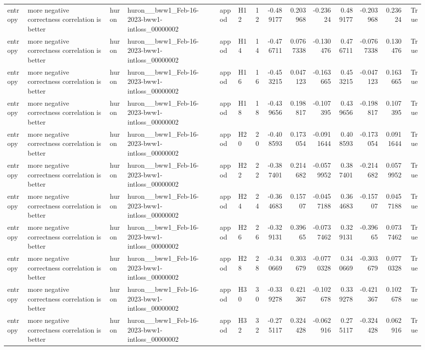 \begin{longtable}{llllllrrrrrrrr}
entropy & more negative correctness correlation is better & huron & huron\_\_bww1\_Feb-16-2023-bww1-intloss\_00000002 & appod & H12 & 12 & -0.489177 & 0.203968 & -0.23624 & 0.489177 & -0.203968 & 0.23624 & True \\
entropy & more negative correctness correlation is better & huron & huron\_\_bww1\_Feb-16-2023-bww1-intloss\_00000002 & appod & H14 & 14 & -0.476711 & 0.0767338 & -0.130476 & 0.476711 & -0.0767338 & 0.130476 & True \\
entropy & more negative correctness correlation is better & huron & huron\_\_bww1\_Feb-16-2023-bww1-intloss\_00000002 & appod & H16 & 16 & -0.453215 & 0.047123 & -0.163665 & 0.453215 & -0.047123 & 0.163665 & True \\
entropy & more negative correctness correlation is better & huron & huron\_\_bww1\_Feb-16-2023-bww1-intloss\_00000002 & appod & H18 & 18 & -0.439656 & 0.198817 & -0.107395 & 0.439656 & -0.198817 & 0.107395 & True \\
entropy & more negative correctness correlation is better & huron & huron\_\_bww1\_Feb-16-2023-bww1-intloss\_00000002 & appod & H20 & 20 & -0.408593 & 0.173054 & -0.0911644 & 0.408593 & -0.173054 & 0.0911644 & True \\
entropy & more negative correctness correlation is better & huron & huron\_\_bww1\_Feb-16-2023-bww1-intloss\_00000002 & appod & H22 & 22 & -0.387401 & 0.214682 & -0.0579952 & 0.387401 & -0.214682 & 0.0579952 & True \\
entropy & more negative correctness correlation is better & huron & huron\_\_bww1\_Feb-16-2023-bww1-intloss\_00000002 & appod & H24 & 24 & -0.364683 & 0.15707 & -0.0457188 & 0.364683 & -0.15707 & 0.0457188 & True \\
entropy & more negative correctness correlation is better & huron & huron\_\_bww1\_Feb-16-2023-bww1-intloss\_00000002 & appod & H26 & 26 & -0.329131 & 0.39665 & -0.0737462 & 0.329131 & -0.39665 & 0.0737462 & True \\
entropy & more negative correctness correlation is better & huron & huron\_\_bww1\_Feb-16-2023-bww1-intloss\_00000002 & appod & H28 & 28 & -0.340669 & 0.303679 & -0.0770328 & 0.340669 & -0.303679 & 0.0770328 & True \\
entropy & more negative correctness correlation is better & huron & huron\_\_bww1\_Feb-16-2023-bww1-intloss\_00000002 & appod & H30 & 30 & -0.339278 & 0.421367 & -0.102678 & 0.339278 & -0.421367 & 0.102678 & True \\
entropy & more negative correctness correlation is better & huron & huron\_\_bww1\_Feb-16-2023-bww1-intloss\_00000002 & appod & H32 & 32 & -0.275117 & 0.324428 & -0.062916 & 0.275117 & -0.324428 & 0.062916 & True \\

\end{longtable}
